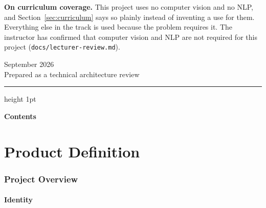 \documentclass[11pt,a4paper]{article}
\begin{document}
\begin{keybox}
\textbf{On curriculum coverage.} This project uses no computer vision and no NLP, and
Section~\ref{sec:curriculum} says so plainly instead of inventing a use for them. Everything else
in the track is used because the problem requires it. The instructor has confirmed that computer
vision and NLP are not required for this project (\texttt{docs/lecturer-review.md}).
\end{keybox}

\vfill
\begin{center}
{\small September 2026 \\[2pt] Prepared as a technical architecture review}
\end{center}

\newpage
\thispagestyle{empty}
{\color{navy}\hrule height 1pt}
\vspace{0.3cm}
{\large\bfseries\color{navy} Contents}
\vspace{-0.2cm}
\renewcommand{\contentsname}{}
\tableofcontents
\newpage
\setcounter{page}{1}
\part{Product Definition}

\section{Project Overview}

\subsection{Identity}
\end{document}
